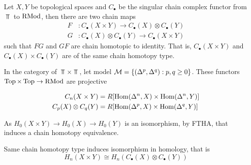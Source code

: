 \begin{theorem}
	Let $X, Y$ be topological spaces and $C_\bullet$ be the singular chain complex functor from $\Top$ to $\operatorname{RMod}$, then there are two chain maps
	\begin{align*}
		F&: C_\bullet(X \times Y) \to C_\bullet(X) \otimes C_\bullet(Y) \\
		G&: C_\bullet(X) \otimes C_\bullet(Y) \to C_\bullet(X \times Y)
	\end{align*}
	such that $FG$ and $GF$ are chain homotopic to identity. That is, $C_\bullet(X \times Y)$ and $C_\bullet(X) \times C_\bullet(Y)$ are of the same chain homotopy type.
\end{theorem}

\begin{longproof}
	
	In the category of $\Top \times \Top$, let model $\mathcal{M} = \{(\Delta^p, \Delta^q): p, q \geq 0\}$. These functors $\operatorname{Top} \times \operatorname{Top} \to \operatorname{RMod}$ are projective
	
	\begin{align*}
		C_n(X \times Y) &= R [\operatorname{Hom}(\Delta^n, X) \times \operatorname{Hom}(\Delta^n, Y)] \\
		C_p(X) \otimes C_q(Y) &= R [\operatorname{Hom}(\Delta^p, X) \times \operatorname{Hom}(\Delta^q, Y)] \\
	\end{align*}
	
	As $H_0(X \times Y) \to H_0(X) \to H_0(Y)$ is an isomorphism, by FTHA, that induces a chain homotopy equivalence.
	
	\begin{center}
	\end{center}
\end{longproof}

\begin{corollary}
	Same chain homotopy type induces isomorphism in homology, that is
	$$
	H_n(X \times Y) \cong H_n(C_\bullet(X) \otimes C_\bullet(Y))
	$$
\end{corollary}






